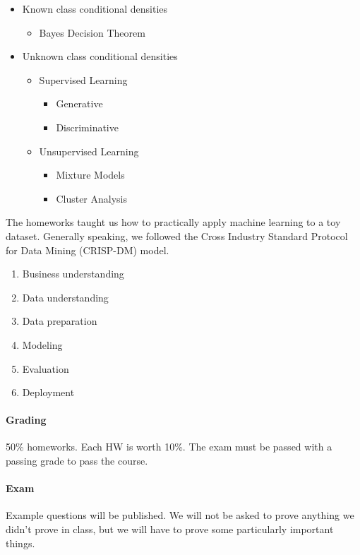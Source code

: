 \documentclass{idc_msc}
\begin{document}
\begin{itemize}
  \item Known class conditional densities
  \begin{itemize}
    \item Bayes Decision Theorem
  \end{itemize}
  \item Unknown class conditional densities
  \begin{itemize}
    \item Supervised Learning
    \begin{itemize}
      \item Generative
      \item Discriminative
    \end{itemize}
    \item Unsupervised Learning
    \begin{itemize}
      \item Mixture Models
      \item Cluster Analysis
    \end{itemize}
  \end{itemize}
\end{itemize}

The homeworks taught us how to practically apply machine learning to a toy dataset.
Generally speaking, we followed the Cross Industry Standard Protocol for Data Mining (CRISP-DM) model.

\begin{enumerate}
  \item Business understanding
  \item Data understanding
  \item Data preparation
  \item Modeling
  \item Evaluation
  \item Deployment
\end{enumerate}

\paragraph{Grading}

50\% homeworks. Each HW is worth 10\%.
The exam must be passed with a passing grade to pass the course.

\paragraph{Exam}

Example questions will be published.
We will not be asked to prove anything we didn't prove in class, but we will have to prove some particularly important things.
\end{document}
